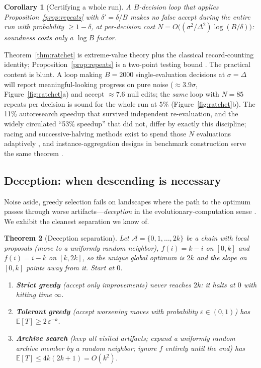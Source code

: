 \documentclass{article}
\theoremstyle{plain}
\newtheorem{theorem}{Theorem}[section]
\newtheorem{corollary}[theorem]{Corollary}
\theoremstyle{definition}
\theoremstyle{remark}
\newcommand{\A}{\mathcal{A}}
\newcommand{\E}{\mathbb{E}}
\newcommand{\eps}{\varepsilon}
\begin{document}
\begin{corollary}[Certifying a whole run]
\label{cor:budget}
A $B$-decision loop that applies Proposition~\ref{prop:repeats} with $\delta' = \delta/B$ makes no false accept during the entire run with probability $\ge 1 - \delta$, at per-decision cost $N = O\!\big((\sigma^2/\Delta^2)\log(B/\delta)\big)$: soundness costs only a $\log B$ factor.
\end{corollary}

Theorem~\ref{thm:ratchet} is extreme-value theory \cite{boucheron2013concentration} plus the classical record-counting identity; Proposition~\ref{prop:repeats} is a two-point testing bound \cite{tsybakov2009introduction, hoeffding1963probability}. The practical content is blunt. A loop making $B = 2000$ single-evaluation decisions at $\sigma = \Delta$ will report meaningful-looking progress on pure noise ($\approx 3.9\sigma$, Figure~\ref{fig:ratchet}a) and accept $\approx 7.6$ null edits; the \emph{same} loop with $N = 85$ repeats per decision is sound for the whole run at 5\% (Figure~\ref{fig:ratchet}b). The 11\% autoresearch speedup that survived independent re-evaluation, and the widely circulated ``53\% speedup'' that did not, differ by exactly this discipline; racing and successive-halving methods exist to spend those $N$ evaluations adaptively \cite{maron1994hoeffding, karnin2013almost, li2017hyperband}, and instance-aggregation designs in benchmark construction serve the same theorem \cite{anonymous2026shopgym}.

\subsection{Deception: when descending is necessary}

Noise aside, greedy selection fails on landscapes where the path to the optimum passes through worse artifacts---\emph{deception} in the evolutionary-computation sense \cite{lehman2011abandoning, stanley2015greatness}. We exhibit the cleanest separation we know of.

\begin{theorem}[Deception separation]
\label{thm:deception}
Let $\A = \{0, 1, \dots, 2k\}$ be a chain with local proposals (move to a uniformly random neighbor), $f(i) = k - i$ on $[0, k]$ and $f(i) = i - k$ on $[k, 2k]$, so the unique global optimum is $2k$ and the slope on $[0,k]$ points away from it. Start at $0$.
\begin{enumerate}\itemsep1pt
\item[(i)] \textbf{Strict greedy} (accept only improvements) never reaches $2k$: it halts at $0$ with hitting time $\infty$.
\item[(ii)] \textbf{Tolerant greedy} (accept worsening moves with probability $\eps \in (0,1)$) has $\E[T] \ge 2\,\eps^{-k}$.
\item[(iii)] \textbf{Archive search} (keep all visited artifacts; expand a uniformly random archive member by a random neighbor; ignore $f$ entirely until the end) has $\E[T] \le 4k(2k+1) = O(k^2)$.
\end{enumerate}
\end{theorem}
\end{document}
